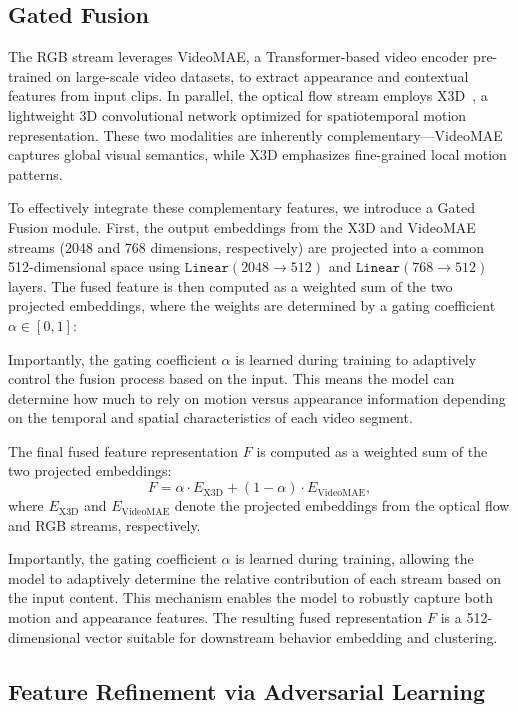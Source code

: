 \documentclass[fleqn,10pt,twocolumn]{AROB}
\begin{document}
\subsection{Gated Fusion}

The RGB stream leverages VideoMAE, a Transformer-based video encoder pre-trained on large-scale video datasets, to extract appearance and contextual features from input clips.
In parallel, the optical flow stream employs X3D~\cite{x3d}, a lightweight 3D convolutional network optimized for spatiotemporal motion representation.
These two modalities are inherently complementary—VideoMAE captures global visual semantics, while X3D emphasizes fine-grained local motion patterns.

To effectively integrate these complementary features, we introduce a Gated Fusion module.
First, the output embeddings from the X3D and VideoMAE streams (2048 and 768 dimensions, respectively) are projected into a common 512-dimensional space using $\texttt{Linear}(2048 \rightarrow 512)$ and $\texttt{Linear}(768 \rightarrow 512)$ layers.
The fused feature is then computed as a weighted sum of the two projected embeddings, where the weights are determined by a gating coefficient $\alpha \in [0, 1]$:

Importantly, the gating coefficient $\alpha$ is learned during training to adaptively control the fusion process based on the input.
This means the model can determine how much to rely on motion versus appearance information depending on the temporal and spatial characteristics of each video segment.

The final fused feature representation $F$ is computed as a weighted sum of the two projected embeddings:
%
\[
F = \alpha \cdot E_{\text{X3D}} + (1 - \alpha) \cdot E_{\text{VideoMAE}},
\]
%
where $E_{\text{X3D}}$ and $E_{\text{VideoMAE}}$ denote the projected embeddings from the optical flow and RGB streams, respectively.

Importantly, the gating coefficient $\alpha$ is learned during training, allowing the model to adaptively determine the relative contribution of each stream based on the input content.
This mechanism enables the model to robustly capture both motion and appearance features.
The resulting fused representation $F$ is a 512-dimensional vector suitable for downstream behavior embedding and clustering.


\subsection{Feature Refinement via Adversarial Learning}
\end{document}
